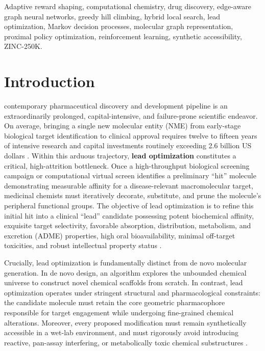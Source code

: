 \documentclass{ieeeaccess}
\begin{document}
\begin{keywords}
Adaptive reward shaping, computational chemistry, drug discovery, edge-aware graph neural networks, greedy hill climbing, hybrid local search, lead optimization, Markov decision processes, molecular graph representation, proximal policy optimization, reinforcement learning, synthetic accessibility, ZINC-250K.
\end{keywords}

\titlepgskip=-15pt
\maketitle


\section{Introduction}
\label{sec:introduction}
 contemporary pharmaceutical discovery and development pipeline is an extraordinarily prolonged, capital-intensive, and failure-prone scientific endeavor. On average, bringing a single new molecular entity (NME) from early-stage biological target identification to clinical approval requires twelve to fifteen years of intensive research and capital investments routinely exceeding 2.6 billion US dollars \cite{lipinski2001,bickerton2012}. Within this arduous trajectory, \textbf{lead optimization} constitutes a critical, high-attrition bottleneck. Once a high-throughput biological screening campaign or computational virtual screen identifies a preliminary ``hit'' molecule demonstrating measurable affinity for a disease-relevant macromolecular target, medicinal chemists must iteratively decorate, substitute, and prune the molecule's peripheral functional groups. The objective of lead optimization is to refine this initial hit into a clinical ``lead'' candidate possessing potent biochemical affinity, exquisite target selectivity, favorable absorption, distribution, metabolism, and excretion (ADME) properties, high oral bioavailability, minimal off-target toxicities, and robust intellectual property status \cite{ertl2009,baell2010}.

Crucially, lead optimization is fundamentally distinct from de novo molecular generation. In de novo design, an algorithm explores the unbounded chemical universe to construct novel chemical scaffolds from scratch. In contrast, lead optimization operates under stringent structural and pharmacological constraints: the candidate molecule must retain the core geometric pharmacophore responsible for target engagement while undergoing fine-grained chemical alterations. Moreover, every proposed modification must remain synthetically accessible in a wet-lab environment, and must rigorously avoid introducing reactive, pan-assay interfering, or metabolically toxic chemical substructures \cite{bemis1996,rogers2010}.
\end{document}
